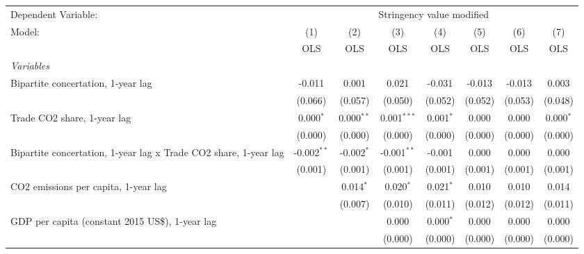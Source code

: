 
\begingroup
\centering
\begin{tabular}{lccccccc}
   \toprule
   Dependent Variable: & \multicolumn{7}{c}{Stringency value modified}\\
   Model:                                                           & (1)           & (2)          & (3)           & (4)         & (5)     & (6)     & (7)\\  
                                                                    &  OLS          & OLS          & OLS           & OLS         & OLS     & OLS     & OLS\\  
   \midrule
   \emph{Variables}\\
   Bipartite concertation, 1-year lag                               & -0.011        & 0.001        & 0.021         & -0.031      & -0.013  & -0.013  & 0.003\\   
                                                                    & (0.066)       & (0.057)      & (0.050)       & (0.052)     & (0.052) & (0.053) & (0.048)\\   
   Trade CO2 share, 1-year lag                                      & 0.000$^{*}$   & 0.000$^{**}$ & 0.001$^{***}$ & 0.001$^{*}$ & 0.000   & 0.000   & 0.000$^{*}$\\   
                                                                    & (0.000)       & (0.000)      & (0.000)       & (0.000)     & (0.000) & (0.000) & (0.000)\\   
   Bipartite concertation, 1-year lag x Trade CO2 share, 1-year lag & -0.002$^{**}$ & -0.002$^{*}$ & -0.001$^{**}$ & -0.001      & 0.000   & 0.000   & 0.000\\   
                                                                    & (0.001)       & (0.001)      & (0.001)       & (0.001)     & (0.001) & (0.001) & (0.001)\\   
   CO2 emissions per capita, 1-year lag                             &               & 0.014$^{*}$  & 0.020$^{*}$   & 0.021$^{*}$ & 0.010   & 0.010   & 0.014\\   
                                                                    &               & (0.007)      & (0.010)       & (0.011)     & (0.012) & (0.012) & (0.011)\\   
   GDP per capita (constant 2015 US\$), 1-year lag                  &               &              & 0.000         & 0.000$^{*}$ & 0.000   & 0.000   & 0.000\\   
                                                                    &               &              & (0.000)       & (0.000)     & (0.000) & (0.000) & (0.000)\\   

\end{tabular}
